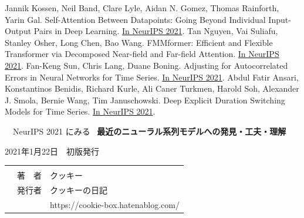 \documentclass[b5paper,xelatex,ja=standard,10pt]{bxjsarticle}
\begin{document}
\begin{thebibliography}{99}
     Jannik Kossen, Neil Band, Clare Lyle, Aidan N. Gomez, Thomas Rainforth, Yarin Gal. Self-Attention Between Datapoints: Going Beyond Individual Input-Output Pairs in Deep Learning. {\href{https://proceedings.neurips.cc/paper/2021/hash/f1507aba9fc82ffa7cc7373c58f8a613-Abstract.html}{In NeurIPS 2021}}.
     Tan Nguyen, Vai Suliafu, Stanley Osher, Long Chen, Bao Wang. FMMformer: Efficient and Flexible Transformer via Decomposed Near-field and Far-field Attention. {\href{https://proceedings.neurips.cc/paper/2021/hash/f621585df244e9596dc70a39b579efb1-Abstract.html}{In NeurIPS 2021}}.
     Fan-Keng Sun, Chris Lang, Duane Boning. Adjusting for Autocorrelated Errors in Neural Networks for Time Series. {\href{https://proceedings.neurips.cc/paper/2021/hash/f8e6ba1db0f3c4054afec1684ba8fb26-Abstract.html}{In NeurIPS 2021}}.
     Abdul Fatir Ansari, Konstantinos Benidis, Richard Kurle, Ali Caner Turkmen, Harold Soh, Alexander J. Smola, Bernie Wang, Tim Januschowski. Deep Explicit Duration Switching Models for Time Series. {\href{https://proceedings.neurips.cc/paper/2021/hash/fb4c835feb0a65cc39739320d7a51c02-Abstract.html}{In NeurIPS 2021}}.
\end{thebibliography}


\clearpage
\vspace*{16.5cm} %
 \, \, NeurIPS 2021 にみる \, \textbf{\large 最近のニューラル系列モデルへの発見・工夫・理解}
\vspace*{-0.27cm}
\begin{OKUDUKE}[title={未完成ドラフト}]
2021年1月22日　初版発行 \\
{
\renewcommand\arraystretch{0.9}
\begin{tabular}{p{4cm}rp{5.9cm}}
 &  &  \\
 & 著　者 & クッキー \\
 & 発行者 & クッキーの日記 \\
 & & https://cookie-box.hatenablog.com/ 
\end{tabular}
}
\end{OKUDUKE}
\thispagestyle{empty}
\end{document}
